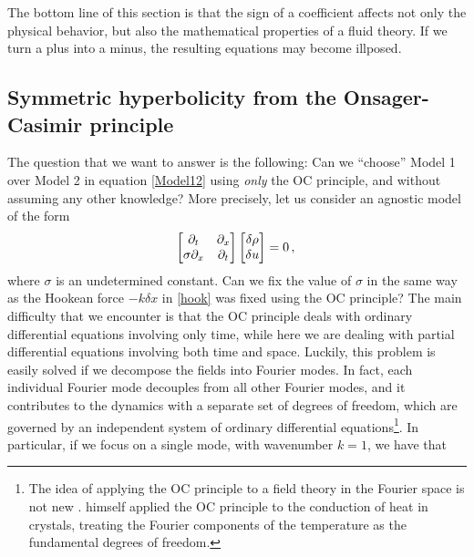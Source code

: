 \documentclass[a4paper, amsfonts, amssymb, amsmath, reprint, showkeys, nofootinbib, twoside, onecolumn,notitlepage]{revtex4-1}
\begin{document}
The bottom line of this section is that the sign of a coefficient affects not only the physical behavior, but also the mathematical properties of a fluid theory. If we turn a plus into a minus, the resulting equations may become illposed.



\subsection{Symmetric hyperbolicity from the Onsager-Casimir principle}

The question that we want to answer is the following: Can we ``choose'' Model 1 over Model 2 in equation \eqref{Model12} using \textit{only} the OC principle, and without assuming any other knowledge? More precisely, let us consider an agnostic model of the form
\begin{equation}\label{agnostuz}
\begin{bmatrix}
\partial_t & \partial_x \\
\sigma\partial_x & \partial_t \\
\end{bmatrix}
\begin{bmatrix}
\delta \rho \\
\delta u \\
\end{bmatrix} =0 \, ,\\
\end{equation}
where $\sigma$ is an undetermined constant. Can we fix the value of $\sigma$ in the same way as the Hookean force $-k\delta x$ in \eqref{hook} was fixed using the OC principle? The main difficulty that we encounter is that the OC principle deals with ordinary differential equations involving only time, while here we are dealing with partial differential equations involving both time and space. Luckily, this problem is easily solved if we decompose the fields into Fourier modes. In fact, each individual Fourier mode decouples from all other Fourier modes, and it contributes to the dynamics with a separate set of degrees of freedom, which are governed by an independent system of ordinary differential equations\footnote{The idea of applying the OC principle to a field theory in the Fourier space is not new \cite{Geigenmuller1983}. \citet{Onsager_Casimir} himself applied the OC principle to the conduction of heat in crystals, treating the Fourier components of the temperature as the fundamental degrees of freedom.}. In particular, if we focus on a single mode, with wavenumber $k=1$, we have that
\end{document}
